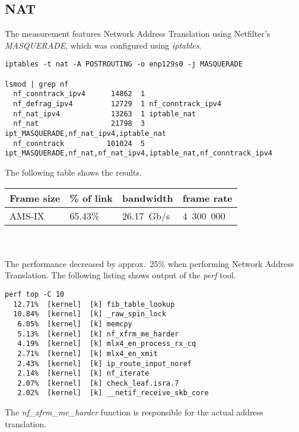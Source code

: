 
\subsection{NAT}
The measurement features Network Address Translation using Netfilter's {\it{MASQUERADE}},
which was configured using {\it{iptables}}.
\begin{lstlisting}
iptables -t nat -A POSTROUTING -o enp129s0 -j MASQUERADE

lsmod | grep nf
  nf_conntrack_ipv4      14862  1 
  nf_defrag_ipv4         12729  1 nf_conntrack_ipv4
  nf_nat_ipv4            13263  1 iptable_nat
  nf_nat                 21798  3 ipt_MASQUERADE,nf_nat_ipv4,iptable_nat
  nf_conntrack          101024  5 ipt_MASQUERADE,nf_nat,nf_nat_ipv4,iptable_nat,nf_conntrack_ipv4
\end{lstlisting}
The following table shows the results.
\begin{tabular}{ | l | l | l | l | }
\hline
Frame size & \% of link & bandwidth & frame rate \\
\hline
AMS-IX & 65.43\% & 26.17~Gb/s & 4~300~000 \\
\hline
\end{tabular}
\\
\\
The performance decreased by approx.~25\% when performing Network Address Translation.
The following listing shows output of the {\it{perf}} tool.
\begin{lstlisting}
perf top -C 10
  12.71%  [kernel]  [k] fib_table_lookup
  10.84%  [kernel]  [k] _raw_spin_lock
   6.05%  [kernel]  [k] memcpy
   5.13%  [kernel]  [k] nf_xfrm_me_harder
   4.19%  [kernel]  [k] mlx4_en_process_rx_cq
   2.71%  [kernel]  [k] mlx4_en_xmit
   2.43%  [kernel]  [k] ip_route_input_noref
   2.14%  [kernel]  [k] nf_iterate
   2.07%  [kernel]  [k] check_leaf.isra.7
   2.02%  [kernel]  [k] __netif_receive_skb_core
\end{lstlisting}
The {\it{nf\_xfrm\_me\_harder}} function is responsible for the actual address translation.
